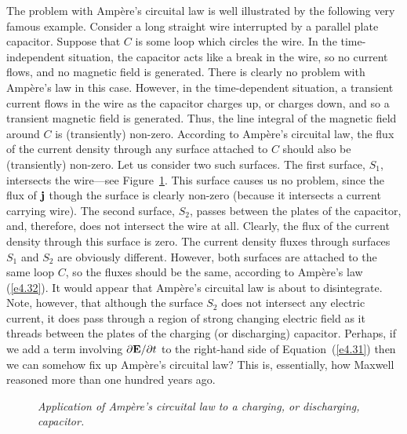The problem with Amp\`{e}re's circuital law is well illustrated by the following very famous
example.
Consider a long straight wire interrupted by a parallel plate capacitor. Suppose
that $C$ is some loop which circles the wire. In the time-independent situation, the
capacitor acts like a break in the wire, so no current flows, and no magnetic
field is generated. There is clearly no problem with Amp\`{e}re's law in this case. 
However, in the time-dependent situation, a transient current flows in the wire as the
capacitor charges up, or charges down, and so a transient magnetic field is generated. 
Thus, the line integral of the magnetic field around $C$ is
(transiently)  non-zero. According to Amp\`{e}re's circuital law, the flux of the current density
through any surface attached to $ C$  should also be (transiently) non-zero.
Let us consider two such surfaces. The
first surface, $S_1$, intersects the wire---see Figure~\ref{fdisp}. This surface
causes us no problem, since the flux of ${\bf j}$ though the surface is clearly
non-zero (because it  intersects
a current carrying wire).
The second surface, $S_2$, passes between the plates of the capacitor, and, therefore,
does not intersect the wire at all. Clearly, the flux of the current density through
this surface is zero. The current density fluxes through surfaces $S_1$ and $S_2$
are obviously different. However, both surfaces are attached to the same loop $C$,
 so
the fluxes should be the same, according to Amp\`{e}re's law (\ref{e4.32}). It would appear 
that Amp\`{e}re's  circuital law is about to disintegrate. Note, however, that although the surface $S_2$ does not intersect any electric current,
it does pass through a region of strong changing
 electric field as it threads between the
plates of the charging (or discharging) capacitor. Perhaps, if we add a term involving
$\partial {\bf E}/{\partial t}$ to the right-hand side of Equation~(\ref{e4.31}) then we
can somehow fix up Amp\`{e}re's circuital law? This is, essentially, how Maxwell reasoned
more than one hundred years ago.
\begin{figure}
\epsfysize=1.5in
\centerline{}
\caption{\em Application of Amp\`{e}re's circuital law to a charging, or discharging, capacitor.}\label{fdisp}
\end{figure}

